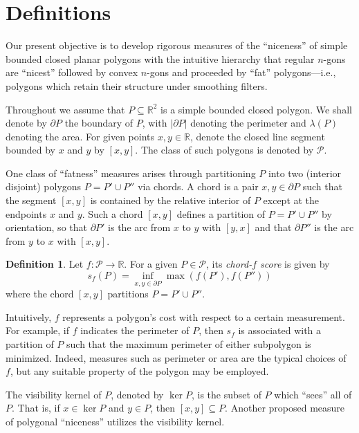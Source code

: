 \documentclass[10pt]{article}
\newcommand{\RR}{\mathbb{R}}
\newcommand{\abs}[1]{\vert#1\vert}
\theoremstyle{definition}
\newtheorem{definition}{Definition}[section]
\begin{document}
\section{Definitions}

Our present objective is to develop rigorous measures of the ``niceness'' of
simple bounded closed planar polygons with the intuitive hierarchy that regular
$n$-gons are ``nicest'' followed by convex $n$-gons and proceeded by ``fat''
polygons---i.e., polygons which retain their structure under smoothing filters.

Throughout we assume that $P \subseteq \RR^2$ is a simple bounded closed
polygon. We shall denote by $\partial P$ the boundary of $P$, with
$\abs{\partial P}$ denoting the perimeter and $\lambda(P)$ denoting the area.
For given points $x,y \in \RR$, denote the closed line segment bounded by $x$
and $y$ by $[x,y]$.  The class of such polygons is denoted by $\mathcal{P}$.

One class of ``fatness'' measures arises through partitioning $P$ into two
(interior disjoint) polygons $P = P' \cup P''$ via chords.  A chord is a pair
$x,y \in \partial P$ such that the segment $[x,y]$ is contained by the relative
interior of $P$ except at the endpoints $x$ and $y$.  Such a chord $[x,y]$
defines a partition of $P = P' \cup P''$ by orientation, so that $\partial P'$
is the arc from $x$ to $y$ with $[y,x]$ and that $\partial P''$ is the arc from
$y$ to $x$ with $[x,y]$. 

\begin{definition}
  Let $f : \mathcal{P} \to \RR$. For a given $P \in \mathcal{P}$,
  its \emph{chord-$f$ score} is given by
  \begin{equation*}
    s_f(P) = \inf_{x,y \in \partial P} \max(f(P'), f(P''))
  \end{equation*}
  where the chord $[x,y]$ partitions $P = P' \cup P''$.
\end{definition}

Intuitively, $f$ represents a polygon's cost with respect to a certain
measurement.  For example, if $f$ indicates the perimeter of $P$, then $s_f$ is
associated with a partition of $P$ such that the maximum perimeter of either
subpolygon is minimized. Indeed, measures such as perimeter or area are the
typical choices of $f$, but any suitable property of the polygon may be
employed.

The visibility kernel of $P$, denoted by $\ker P$, is the subset of $P$ which
``sees'' all of $P$. That is, if $x \in \ker P$ and $y \in P$, then $[x,y]
\subseteq P$. Another proposed measure of polygonal ``niceness'' utilizes the
visibility kernel.
\end{document}
